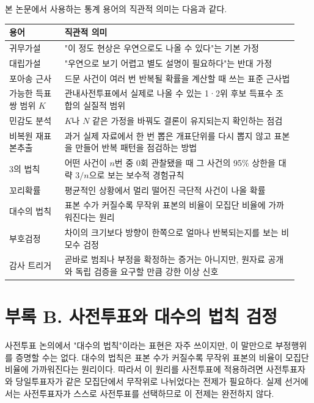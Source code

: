 \documentclass[preprint]{IEIE}
\begin{document}
본 논문에서 사용하는 통계 용어의 직관적 의미는 다음과 같다.

\begin{center}
\small
\begin{tabular}{>{\raggedright\arraybackslash}p{0.18\linewidth}>{\raggedright\arraybackslash}p{0.76\linewidth}}
\toprule
용어 & 직관적 의미 \\
\midrule
귀무가설 & "이 정도 현상은 우연으로도 나올 수 있다"는 기본 가정 \\
대립가설 & "우연으로 보기 어렵고 별도 설명이 필요하다"는 반대 가정 \\
포아송 근사 & 드문 사건이 여러 번 반복될 확률을 계산할 때 쓰는 표준 근사법 \\
가능한 득표쌍 범위 \(K\) & 관내사전투표에서 실제로 나올 수 있는 1·2위 후보 득표수 조합의 실질적 범위 \\
민감도 분석 & \(K\)나 \(N\) 같은 가정을 바꿔도 결론이 유지되는지 확인하는 점검 \\
비복원 재표본추출 & 과거 실제 자료에서 한 번 뽑은 개표단위를 다시 뽑지 않고 표본을 만들어 반복 패턴을 점검하는 방법 \\
3의 법칙 & 어떤 사건이 \(n\)번 중 0회 관찰됐을 때 그 사건의 95\% 상한을 대략 \(3/n\)으로 보는 보수적 경험규칙 \\
꼬리확률 & 평균적인 상황에서 멀리 떨어진 극단적 사건이 나올 확률 \\
대수의 법칙 & 표본 수가 커질수록 무작위 표본의 비율이 모집단 비율에 가까워진다는 원리 \\
부호검정 & 차이의 크기보다 방향이 한쪽으로 얼마나 반복되는지를 보는 비모수 검정 \\
감사 트리거 & 곧바로 범죄나 부정을 확정하는 증거는 아니지만, 원자료 공개와 독립 검증을 요구할 만큼 강한 이상 신호 \\
\bottomrule
\end{tabular}
\end{center}

\vspace{1em}
\section*{부록 B. 사전투표와 대수의 법칙 검정}

사전투표 논의에서 "대수의 법칙"이라는 표현은 자주 쓰이지만, 이 말만으로 부정행위를 증명할 수는 없다. 대수의 법칙은 표본 수가 커질수록 무작위 표본의 비율이 모집단 비율에 가까워진다는 원리이다. 따라서 이 원리를 사전투표에 적용하려면 사전투표자와 당일투표자가 같은 모집단에서 무작위로 나뉘었다는 전제가 필요하다. 실제 선거에서는 사전투표자가 스스로 사전투표를 선택하므로 이 전제는 완전하지 않다.
\end{document}
